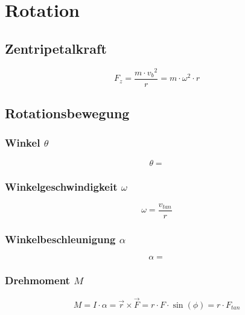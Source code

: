 



\chapter{Rotation}
\section{Zentripetalkraft}
\[ F_z = \frac{m \cdot {v_b}^2}{r} = m \cdot \omega^2 \cdot r \]

\section{Rotationsbewegung}

\subsection{Winkel $\theta$}
\[ \theta =  \]

\subsection{Winkelgeschwindigkeit $\omega$}
\[ \omega = \frac{v_{tan}}{r} \]

\subsection{Winkelbeschleunigung $\alpha$}
\[ \alpha =  \]

\subsection{Drehmoment $M$}
\[ M = I \cdot \alpha = \vec{r} \times \vec{F} = r \cdot F \cdot \sin(\phi) 
= r \cdot F_{tan} \]

